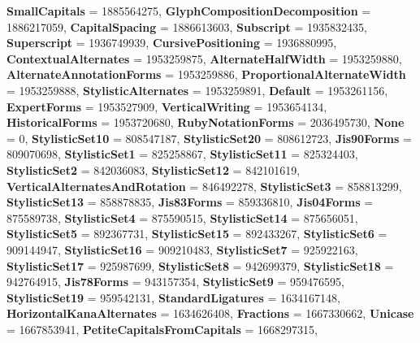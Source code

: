 \begin{DoxyCompactItemize}
{\bfseries Small\+Capitals} = 1885564275, 
{\bfseries Glyph\+Composition\+Decomposition} = 1886217059, 
{\bfseries Capital\+Spacing} = 1886613603, 
{\bfseries Subscript} = 1935832435, 
\newline
{\bfseries Superscript} = 1936749939, 
{\bfseries Cursive\+Positioning} = 1936880995, 
{\bfseries Contextual\+Alternates} = 1953259875, 
{\bfseries Alternate\+Half\+Width} = 1953259880, 
\newline
{\bfseries Alternate\+Annotation\+Forms} = 1953259886, 
{\bfseries Proportional\+Alternate\+Width} = 1953259888, 
{\bfseries Stylistic\+Alternates} = 1953259891, 
{\bfseries Default} = 1953261156, 
\newline
{\bfseries Expert\+Forms} = 1953527909, 
{\bfseries Vertical\+Writing} = 1953654134, 
{\bfseries Historical\+Forms} = 1953720680, 
{\bfseries Ruby\+Notation\+Forms} = 2036495730, 
\newline
{\bfseries None} = 0, 
{\bfseries Stylistic\+Set10} = 808547187, 
{\bfseries Stylistic\+Set20} = 808612723, 
{\bfseries Jis90\+Forms} = 809070698, 
\newline
{\bfseries Stylistic\+Set1} = 825258867, 
{\bfseries Stylistic\+Set11} = 825324403, 
{\bfseries Stylistic\+Set2} = 842036083, 
{\bfseries Stylistic\+Set12} = 842101619, 
\newline
{\bfseries Vertical\+Alternates\+And\+Rotation} = 846492278, 
{\bfseries Stylistic\+Set3} = 858813299, 
{\bfseries Stylistic\+Set13} = 858878835, 
{\bfseries Jis83\+Forms} = 859336810, 
\newline
{\bfseries Jis04\+Forms} = 875589738, 
{\bfseries Stylistic\+Set4} = 875590515, 
{\bfseries Stylistic\+Set14} = 875656051, 
{\bfseries Stylistic\+Set5} = 892367731, 
\newline
{\bfseries Stylistic\+Set15} = 892433267, 
{\bfseries Stylistic\+Set6} = 909144947, 
{\bfseries Stylistic\+Set16} = 909210483, 
{\bfseries Stylistic\+Set7} = 925922163, 
\newline
{\bfseries Stylistic\+Set17} = 925987699, 
{\bfseries Stylistic\+Set8} = 942699379, 
{\bfseries Stylistic\+Set18} = 942764915, 
{\bfseries Jis78\+Forms} = 943157354, 
\newline
{\bfseries Stylistic\+Set9} = 959476595, 
{\bfseries Stylistic\+Set19} = 959542131, 
{\bfseries Standard\+Ligatures} = 1634167148, 
{\bfseries Horizontal\+Kana\+Alternates} = 1634626408, 
\newline
{\bfseries Fractions} = 1667330662, 
{\bfseries Unicase} = 1667853941, 
{\bfseries Petite\+Capitals\+From\+Capitals} = 1668297315, 

\end{DoxyCompactItemize}
